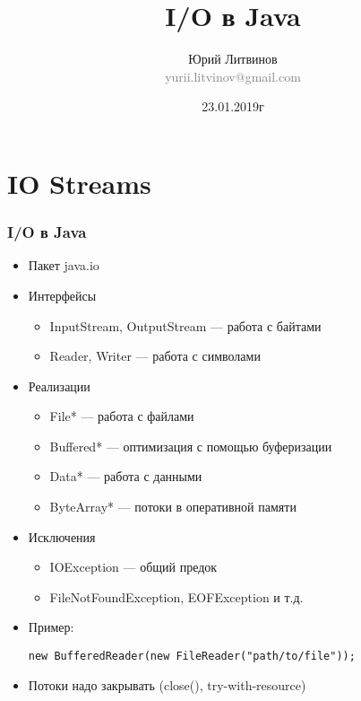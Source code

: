 \documentclass[xetex,mathserif,serif]{beamer}
\title{I/O в Java}
\author[Юрий Литвинов]{Юрий Литвинов\\\small{\textcolor{gray}{yurii.litvinov@gmail.com}}}
\date{23.01.2019г}
\begin{document}
	\frame{\titlepage}

	\section{IO Streams}

	\begin{frame}[fragile]
		\frametitle{I/O в Java}
		\begin{itemize}
			\item Пакет java.io
			\item Интерфейсы
			\begin{itemize}
				\item InputStream, OutputStream --- работа с байтами
				\item Reader, Writer --- работа с символами
			\end{itemize}
			\item Реализации
			\begin{itemize}
				\item File* --- работа с файлами
				\item Buffered* --- оптимизация с помощью буферизации
				\item Data* --- работа с данными
				\item ByteArray* --- потоки в оперативной памяти
			\end{itemize}
			\item Исключения
			\begin{itemize}
				\item IOException --- общий предок
				\item FileNotFoundException, EOFException и т.д.
			\end{itemize}
			\item Пример:
				\begin{verbatim}
new BufferedReader(new FileReader("path/to/file"));
				\end{verbatim}
			\item Потоки надо закрывать (close(), try-with-resource)
		\end{itemize}
	\end{frame}
\end{document}
